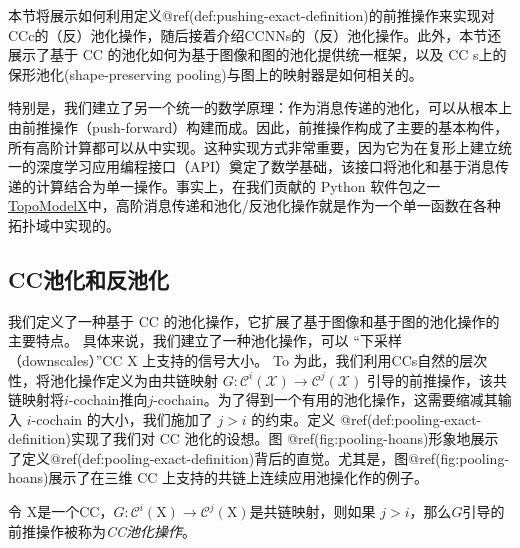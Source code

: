 \documentclass[
  12pt,
]{krantz}
\begin{document}
本节将展示如何利用定义@ref(def:pushing-exact-definition)的前推操作来实现对CCc的（反）池化操作，随后接着介绍CCNNs的（反）池化操作。此外，本节还展示了基于
CC 的池化如何为基于图像和图的池化提供统一框架，以及 CC
s上的保形池化(shape-preserving pooling)与图上的映射器是如何相关的。

特别是，我们建立了另一个统一的数学原理：作为消息传递的池化，可以从根本上由前推操作（push-forward）构建而成。因此，前推操作构成了主要的基本构件，所有高阶计算都可以从中实现。这种实现方式非常重要，因为它为在复形上建立统一的深度学习应用编程接口（API）奠定了数学基础，该接口将池化和基于消息传递的计算结合为单一操作。事实上，在我们贡献的
Python 软件包之一
\href{https://github.com/pyt-team/TopoModelX}{TopoModelX}中，高阶消息传递和池化/反池化操作就是作为一个单一函数在各种拓扑域中实现的。

\subsection{CC池化和反池化}\label{cc-pooling-and-unpooling}

我们定义了一种基于 CC
的池化操作，它扩展了基于图像和基于图的池化操作的主要特点。
具体来说，我们建立了一种池化操作，可以 ``下采样（downscales）''CC
\(\mbox{X}\) 上支持的信号大小。 To
为此，我们利用CCs自然的层次性，将池化操作定义为由共链映射
\(G\colon\mathcal{C}^{i}(\mathcal{X})\to \mathcal{C}^{j}(\mathcal{X})\)
引导的前推操作，该共链映射将\(i\)-cochain推向\(j\)-cochain。为了得到一个有用的池化操作，这需要缩减其输入
\(i\)-cochain 的大小，我们施加了 \(j>i\) 的约束。定义
@ref(def:pooling-exact-definition)实现了我们对 CC 池化的设想。图
@ref(fig:pooling-hoans)形象地展示了定义@ref(def:pooling-exact-definition)背后的直觉。尤其是，图@ref(fig:pooling-hoans)展示了在三维
CC 上支持的共链上连续应用池操化作的例子。

\label{pooling-exact-definition}
令
\(\mbox{X}\)是一个CC，\(G\colon\mathcal{C}^{i}( \mbox{X})\to \mathcal{C}^{j}( \mbox{X})\)是共链映射，则如果
\(j>i\)，那么\(G\)引导的前推操作被称为\emph{CC池化操作}。
\end{document}
